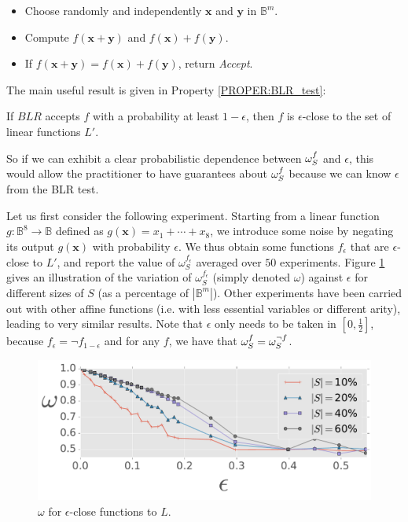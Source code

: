 \begin{itemize}
\item Choose randomly and independently $\mathbf{x}$ and $\mathbf{y}$ in
  $\mathbb{B}^m$.
\item Compute $f(\mathbf{x}+\mathbf{y})$ and $f(\mathbf{x}) + f(\mathbf{y})$.
\item If $f(\mathbf{x}+\mathbf{y}) = f(\mathbf{x}) + f(\mathbf{y})$, return
  \textit{Accept}.
\end{itemize}

The main useful result is given in Property \ref{PROPER:BLR_test}:
\begin{property}
  \label{PROPER:BLR_test}
  If $BLR$ accepts $f$ with a probability at least $1-\epsilon$, then $f$ is
  $\epsilon$-close to the set of linear functions $L'$.
\end{property}

So if we can exhibit a clear probabilistic dependence between $\omega_{S}^{f}$
and $\epsilon$, this would allow the practitioner to have guarantees about
$\omega_{S}^{f}$ because we can know $\epsilon$ from the BLR test.

Let us first consider the following experiment. Starting from a linear function $g
\colon \mathbb{B}^8 \to \mathbb{B}$ defined as  $g(\mathbf{x}) = x_1 + \cdots +
x_8$, we introduce some noise by negating its output $g(\mathbf{x})$ with
probability $\epsilon$. We thus obtain some functions $f_{\epsilon}$ that are
$\epsilon$-close to $L'$, and report the value of $\omega_S^{f_\epsilon}$ averaged over $50$
experiments.  Figure \ref{omega_vs_eps} gives an
illustration of the variation of $\omega_S^{f_\epsilon}$ (simply denoted
$\omega$) against  $\epsilon$ for different
sizes of $S$ (as a percentage of $|\mathbb{B}^m|$).  Other experiments have
been carried out with other affine functions (i.e.  with less essential
variables or different arity), leading to very similar results.  Note that
$\epsilon$ only needs to be taken in $[0, \frac{1}{2}]$, because $f_\epsilon =
\neg f_{1 - \epsilon}$ and for any $f$, we have that $\omega_{S}^{f} = \omega_S^{\neg
f}$.

\begin{figure}
\begin{center}
\includegraphics[scale=0.6]{figures/omega_vs_eps_dim8_nexp50_std_nEss8.pdf}
  \caption{$\omega$ for $\epsilon$-close functions to $L$.}
\label{omega_vs_eps}
\end{center}
\end{figure}


